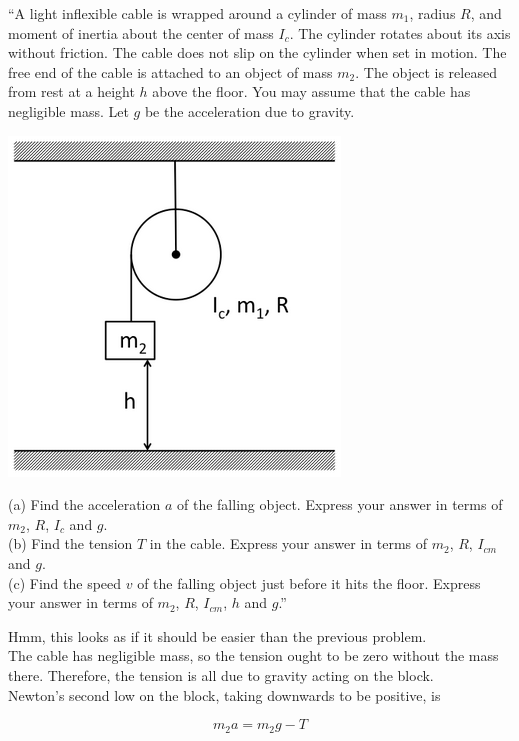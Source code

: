 \documentclass[8.01x]{subfiles}
\begin{document}
``A light inflexible cable is wrapped around a cylinder of mass $m_1$, radius $R$, and moment of inertia about the center of mass $I_c$. The cylinder rotates about its axis without friction. The cable does not slip on the cylinder when set in motion. The free end of the cable is attached to an object of mass $m_2$. The object is released from rest at a height $h$ above the floor. You may assume that the cable has negligible mass. Let $g$ be the acceleration due to gravity.

\begin{center}
\includegraphics[scale=0.65]{Graphics/h7p4}
\end{center}

(a) Find the acceleration $a$ of the falling object. Express your answer in terms of $m_2$, $R$, $I_c$ and $g$.\\
(b) Find the tension $T$ in the cable. Express your answer in terms of $m_2$, $R$, $I_{cm}$ and $g$.\\
(c) Find the speed $v$ of the falling object just before it hits the floor. Express your answer in terms of $m_2$, $R$, $I_{cm}$, $h$ and $g$.''

Hmm, this looks as if it should be easier than the previous problem.\\
The cable has negligible mass, so the tension ought to be zero without the mass there. Therefore, the tension is all due to gravity acting on the block.\\
Newton's second low on the block, taking downwards to be positive, is

\begin{equation}
m_2 a = m_2 g - T
\end{equation}
\end{document}
